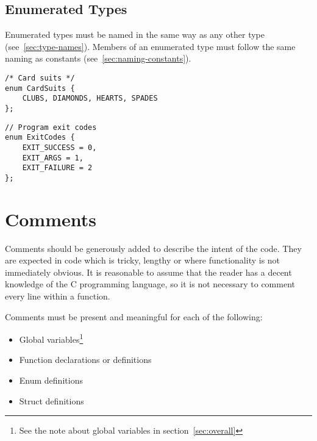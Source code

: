 \documentclass{article}
\begin{document}
\subsection{Enumerated Types}
Enumerated types must be named in the same way as any other type (see~\ref{sec:type-names}).
Members of an enumerated type must follow the same naming as constants (see~\ref{sec:naming-constants}).

\begin{multicols}{2}
\begin{lstlisting}
/* Card suits */
enum CardSuits {
    CLUBS, DIAMONDS, HEARTS, SPADES
};
\end{lstlisting}
\vfill
\columnbreak

\begin{lstlisting}
// Program exit codes
enum ExitCodes {
    EXIT_SUCCESS = 0,
    EXIT_ARGS = 1,
    EXIT_FAILURE = 2
};
\end{lstlisting}
\end{multicols}


\section{Comments}
Comments should be generously added to describe the intent of the code.
They are expected in code which is tricky, lengthy or where functionality is not immediately obvious.
It is reasonable to assume that the reader has a decent knowledge of the C programming language, 
so it is not necessary to comment every line within a function.

Comments must be present and meaningful for each of the following:
\begin{itemize}
    \item Global variables\footnote{See the note about global variables in section~\ref{sec:overall}}
    \item Function declarations or definitions
    \item Enum definitions
    \item Struct definitions
\end{itemize}
\end{document}
